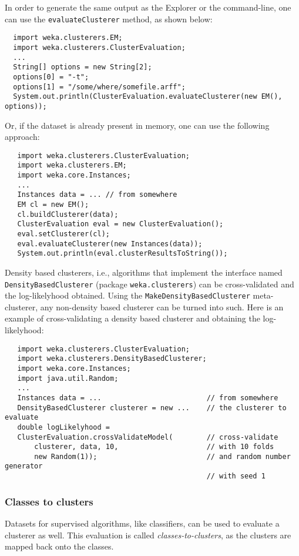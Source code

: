 In order to generate the same output as the Explorer or the command-line, one
can use the \texttt{evaluateClusterer} method, as shown below:
\begin{verbatim}
  import weka.clusterers.EM;
  import weka.clusterers.ClusterEvaluation;
  ...
  String[] options = new String[2];
  options[0] = "-t";
  options[1] = "/some/where/somefile.arff";
  System.out.println(ClusterEvaluation.evaluateClusterer(new EM(), options));
\end{verbatim}
Or, if the dataset is already present in memory, one can use the following
approach:
\begin{verbatim}
   import weka.clusterers.ClusterEvaluation;
   import weka.clusterers.EM;
   import weka.core.Instances;
   ...
   Instances data = ... // from somewhere
   EM cl = new EM();
   cl.buildClusterer(data);
   ClusterEvaluation eval = new ClusterEvaluation();
   eval.setClusterer(cl);
   eval.evaluateClusterer(new Instances(data));
   System.out.println(eval.clusterResultsToString());
\end{verbatim}
Density based clusterers, i.e., algorithms that implement the interface named
\texttt{DensityBasedClusterer} (package \texttt{weka.clusterers}) can
be cross-validated and the log-likelyhood obtained. Using the
\texttt{MakeDensityBasedClusterer} meta-clusterer, any non-density based
clusterer can be turned into such. Here is an example of cross-validating a
density based clusterer and obtaining the log-likelyhood:
\begin{verbatim}
   import weka.clusterers.ClusterEvaluation;
   import weka.clusterers.DensityBasedClusterer;
   import weka.core.Instances;
   import java.util.Random;
   ...
   Instances data = ...                         // from somewhere
   DensityBasedClusterer clusterer = new ...    // the clusterer to evaluate
   double logLikelyhood =
   ClusterEvaluation.crossValidateModel(        // cross-validate
       clusterer, data, 10,                     // with 10 folds
       new Random(1));                          // and random number generator
                                                // with seed 1
\end{verbatim}

\newpage

\subsubsection*{Classes to clusters}
Datasets for supervised algorithms, like classifiers, can be used to
evaluate a clusterer as well. This evaluation is called
\textit{classes-to-clusters}, as the clusters are mapped back onto the classes.

